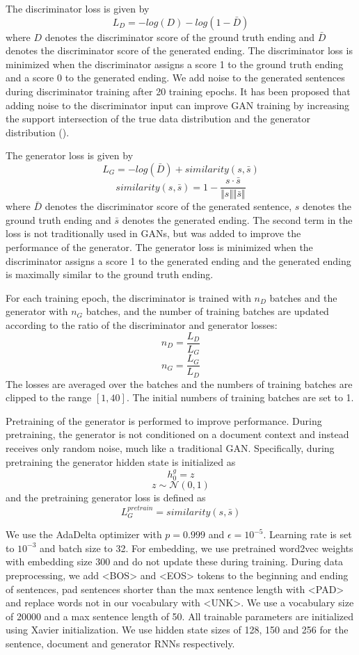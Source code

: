 \documentclass{article}
\begin{document}
The discriminator loss is given by
$$ L_{D} = -log(D) - log(1-\bar{D})$$
where $D$ denotes the discriminator score of the ground truth ending and $\bar{D}$ denotes the discriminator score of the generated ending. The discriminator loss is minimized when the discriminator assigns a score 1 to the ground truth ending and a score 0 to the generated ending.
We add noise to the generated sentences during discriminator training after 20 training epochs. It has been proposed that adding noise to the discriminator input can improve GAN training by increasing the support intersection of the true data distribution and the generator distribution (\cite{2017ariv170104862A}).

The generator loss is given by
$$ L_{G} = -log(\bar{D}) + similarity(s, \bar{s}) $$
$$ similarity(s, \bar{s}) = 1 - \frac{s \cdot \bar{s}}{\Vert s \Vert \Vert \bar{s} \Vert} $$
where $\bar{D}$ denotes the discriminator score of the generated sentence, $s$ denotes the ground truth ending and $\bar{s}$ denotes the generated ending. The second term in the loss is not traditionally used in GANs, but was added to improve the performance of the generator. The generator loss is minimized when the discriminator assigns a score 1 to the generated ending and the generated ending is maximally similar to the ground truth ending.

For each training epoch, the discriminator is trained with $n_{D}$ batches and the generator with $n_{G}$ batches, and the number of training batches are updated according to the ratio of the discriminator and generator losses:
$$ n_{D} = \frac{L_{D}}{L_{G}} $$ 
$$ n_{G} = \frac{L_{G}}{L_{D}} $$
The losses are averaged over the batches and the numbers of training batches are clipped to the range $[1,40]$. The initial numbers of training batches are set to 1.

Pretraining of the generator is performed to improve performance. During pretraining, the generator is not conditioned on a document context and instead receives only random noise, much like a traditional GAN. Specifically, during pretraining the generator hidden state is initialized as
$$ h^{g}_{0} = z $$
$$ z \sim \mathcal{N}(0,1) $$
and the pretraining generator loss is defined as
$$ L_{G}^{pretrain} = similarity(s, \bar{s}) $$

We use the AdaDelta optimizer with $p=0.999$ and $\epsilon=10^{-5}$. Learning rate is set to $10^{-3}$ and batch size to 32. For embedding, we use pretrained word2vec weights with embedding size 300 and do not update these during training. During data preprocessing, we add <BOS> and <EOS> tokens to the beginning and ending of sentences, pad sentences shorter than the max sentence length with <PAD> and replace words not in our vocabulary with <UNK>. We use a vocabulary size of 20000 and a max sentence length of 50. All trainable parameters are initialized using Xavier initialization. We use hidden state sizes of 128, 150 and 256 for the sentence, document and generator RNNs respectively.
\end{document}

